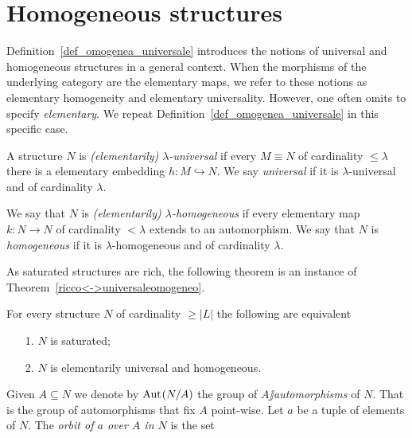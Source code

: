 \documentclass[creche.tex]{subfiles}
\begin{document}
\section{Homogeneous structures}\label{homogeneous}
Definition~\ref{def_omogenea_universale} introduces the notions of universal and homogeneous structures in a general context. When the morphisms of the underlying category are the elementary maps, we refer to these notions as elementary homogeneity and elementary universality. However, one often omits to specify \textit{elementary}. We repeat Definition~\ref{def_omogenea_universale} in this specific case. 

\begin{definition}
A structure $N$ is \emph{(elementarily) $\lambda$-universal\/} if every $M\equiv N$ of cardinality $\le\lambda$ there is a elementary embedding $h:M\hookrightarrow N$. We say  \emph{universal\/}  if it is $\lambda$-universal and of cardinality $\lambda$.

We say that $N$ is \emph{(elementarily) $\lambda$-homogeneous\/} if every elementary map $k:N\to N$ of cardinality $<\lambda$ extends to an automorphism. We say that $N$ is \emph{homogeneous\/} if it is $\lambda$-homogeneous and of cardinality $\lambda$.\QED
\end{definition}

As saturated structures are rich, the following theorem is an instance of Theorem~\ref{ricco<->universaleomogeneo}.

\begin{theorem}\label{thm_saturo_omogeneouniversale}
For every structure $N$ of cardinality $\ge|L|$ the following are equivalent\nobreak
\begin{itemize}
\item[1.] $N$ is saturated;
\item[2.] $N$ is elementarily universal and homogeneous.\QED
\end{itemize}
\end{theorem}

Given $A\subseteq N$ we denote by \emph{$\textrm{Aut\kern.15ex}(N/A)$\/} the group of \emph{$A\jj$automorphisms\/} of $N$. That is the group of automorphisms that fix $A$ point-wise. Let $a$ be a tuple of elements of $N$. The \emph{orbit of $a$ over $A$ in $N$} is the set

\end{document}

